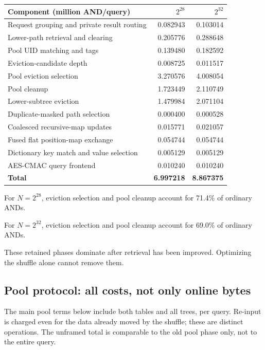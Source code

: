 \begin{center}\small
\begin{tabular}{lrr}\toprule
Component (million AND/query) & $2^{28}$ & $2^{32}$\\\midrule
Request grouping and private result routing & 0.082943 & 0.103014\\
Lower-path retrieval and clearing & 0.205776 & 0.288648\\
Pool UID matching and tags & 0.139480 & 0.182592\\
Eviction-candidate depth & 0.008725 & 0.011517\\
Pool eviction selection & 3.270576 & 4.008054\\
Pool cleanup & 1.723449 & 2.110749\\
Lower-subtree eviction & 1.479984 & 2.071104\\
Duplicate-masked path selection & 0.000400 & 0.000528\\
Coalesced recursive-map updates & 0.015771 & 0.021057\\
Fused flat position-map exchange & 0.054744 & 0.054744\\
Dictionary key match and value selection & 0.005129 & 0.005129\\
AES-CMAC query frontend & 0.010240 & 0.010240\\
\textbf{Total} & \textbf{6.997218} & \textbf{8.867375}\\
\bottomrule\end{tabular}
\end{center}

For $N=2^{28}$, eviction selection and pool cleanup account for 71.4\% of ordinary ANDs.

For $N=2^{32}$, eviction selection and pool cleanup account for 69.0\% of ordinary ANDs.

These retained phases dominate after retrieval has been
improved. Optimizing the shuffle alone cannot remove them.

\subsection{Pool protocol: all costs, not only online bytes}
The main pool terms below include both tables and all trees, per query.
Re-input is charged even for the data already moved by the shuffle; these
are distinct operations. The unframed total is comparable to the old pool
phase only, not to the entire query.

